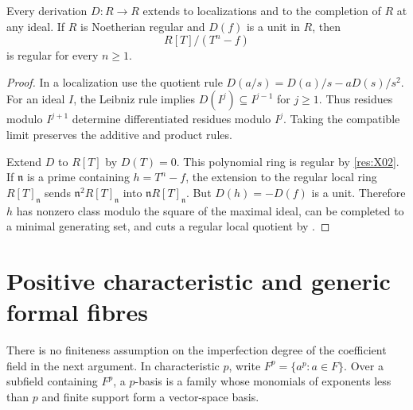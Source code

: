 \begin{lemma}\label{res:X03}
Every derivation \(D:R\to R\) extends to localizations and to the completion of \(R\) at any ideal. If \(R\) is Noetherian regular and \(D(f)\) is a unit in \(R\), then
\[
             R[T]/(T^n-f)
\]
is regular for every \(n\geq 1\).
\end{lemma}
\begin{proof}
In a localization use the quotient rule
\(D(a/s)=D(a)/s-aD(s)/s^2\). For an ideal \(I\), the Leibniz rule implies
\(D(I^j)\subseteq I^{j-1}\) for \(j\geq1\). Thus residues modulo \(I^{j+1}\) determine differentiated residues modulo \(I^j\). Taking the compatible limit preserves the additive and product rules.

Extend \(D\) to \(R[T]\) by \(D(T)=0\). This polynomial ring is regular by \ref{res:X02}. If \(\mathfrak n\) is a prime containing \(h=T^n-f\), the extension to the regular local ring \(R[T]_{\mathfrak n}\) sends \(\mathfrak n^2R[T]_{\mathfrak n}\) into \(\mathfrak nR[T]_{\mathfrak n}\). But \(D(h)=-D(f)\) is a unit. Therefore \(h\) has nonzero class modulo the square of the maximal ideal, can be completed to a minimal generating set, and cuts a regular local quotient by \cite[CM-08]{core}.
\end{proof}

\section[Generic formal fibres]{Positive characteristic and generic formal fibres}

There is no finiteness assumption on the imperfection degree of the coefficient field in the next argument. In characteristic \(p\), write \(F^p=\{a^p:a\in F\}\). Over a subfield containing \(F^p\), a \(p\)-basis is a family whose monomials of exponents less than \(p\) and finite support form a vector-space basis.

